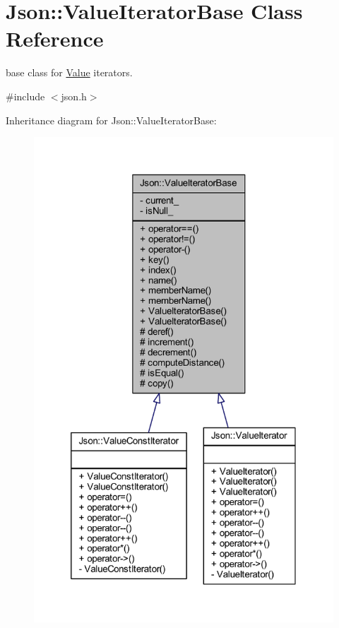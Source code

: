 \hypertarget{class_json_1_1_value_iterator_base}{}\section{Json\+:\+:Value\+Iterator\+Base Class Reference}
\label{class_json_1_1_value_iterator_base}


base class for \hyperlink{class_json_1_1_value}{Value} iterators.  




{\ttfamily \#include $<$json.\+h$>$}



Inheritance diagram for Json\+:\+:Value\+Iterator\+Base\+:\nopagebreak
\begin{figure}[H]
\begin{center}
\leavevmode
\includegraphics[width=320pt]{class_json_1_1_value_iterator_base__inherit__graph}
\end{center}
\end{figure}


